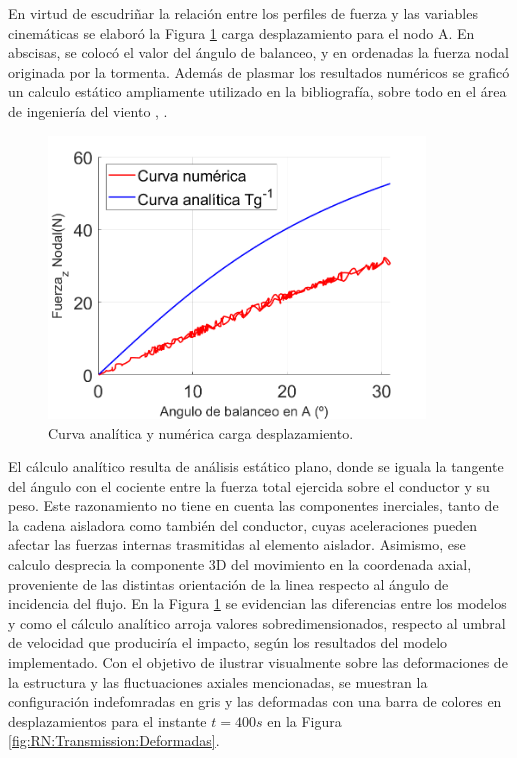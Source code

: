 En virtud de escudriñar la relación entre los perfiles de fuerza y las variables cinemáticas se elaboró la Figura \ref{fig:RN:Trnamission:CurvaCargaDisp} carga desplazamiento para el nodo A. En abscisas, se colocó el valor del ángulo de balanceo, y en ordenadas la fuerza nodal originada por la tormenta. Además de plasmar los resultados numéricos se graficó un calculo estático ampliamente utilizado en la bibliografía, sobre todo en el área de ingeniería del viento \citep{stengel2017measurements}, \citep{duranona2009analysis} \citep{yang2016nonlinear}.


\begin{figure}[htbp]
	\centering
	\includegraphics[width=100mm]{./imagenes/ResultadosNumericos/TransmissionTormenta/FuerzaAngulo_TS.png}
	\caption{Curva analítica y numérica carga desplazamiento.}
	\label{fig:RN:Trnamission:CurvaCargaDisp}
\end{figure}
 
 El cálculo analítico resulta de análisis estático plano, donde se iguala la tangente del ángulo con el cociente entre la fuerza total ejercida sobre el conductor y su peso. Este razonamiento no tiene en cuenta las componentes inerciales, tanto de la cadena aisladora como también del conductor, cuyas aceleraciones pueden afectar las fuerzas internas trasmitidas al elemento aislador. Asimismo, ese calculo desprecia la componente 3D del movimiento en la coordenada axial, proveniente de las distintas orientación de la linea respecto al ángulo de incidencia del flujo. En la Figura \ref{fig:RN:Trnamission:CurvaCargaDisp} se evidencian las diferencias entre los modelos y como el cálculo analítico arroja valores sobredimensionados, respecto al umbral de velocidad que produciría el impacto, según los resultados del modelo implementado. Con el objetivo de ilustrar visualmente sobre las deformaciones de la estructura y las fluctuaciones axiales mencionadas, se muestran la configuración indefomradas en gris y las deformadas con una barra de colores en desplazamientos para el instante $t=400 s$ en la Figura \ref{fig:RN:Transmission:Deformadas}.
 
